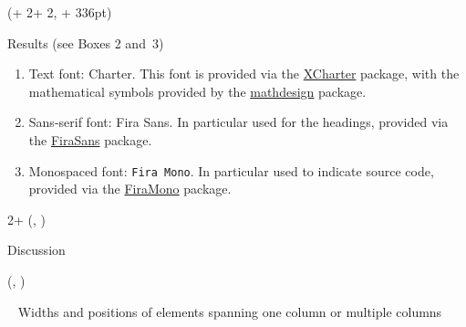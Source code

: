 \documentclass{beamer}
\newlength{\blockThree}
\newlength{\blockFour}
\begin{document}
\begin{frame}[t]
\begin{textblock*}{\colwidth}
\end{textblock*}




\begin{textblock*}{\colwidth}(\leftmargin + 2\colwidth + 2\colsep, \blockThree + 336pt)

\begin{parblock}{Results {\mdseries(see Boxes 2 and~3)}}
	\vspace{-1.333333\baselineskip}  %
	\begin{enumerate}
		\item \alert{Text font:} \textrm{Charter}. This font is provided via the \href{https://ctan.org/pkg/xcharter}{XCharter} package, with the mathematical symbols provided by the \href{https://ctan.org/pkg/mathdesign}{mathdesign} package. 
		\item \alert{Sans-serif font:} \textsf{Fira Sans}. In particular used for the headings, provided via the \href{https://ctan.org/pkg/fira}{FiraSans} package.
		\item \alert{Monospaced font:} \texttt{Fira Mono}. In particular used to indicate source code, provided via the \href{https://ctan.org/pkg/fira}{FiraMono} package.
	\end{enumerate}
\end{parblock}

\end{textblock*}




\begin{textblock*}{2\colwidth + \colsep}(\leftmargin, \blockFour)

\begin{parblock}{Discussion}
\end{parblock}

\end{textblock*}




\begin{textblock*}{\colwidth}(\leftmargin, \blockFour)

\begin{parblock}{~}  %
	\alert{Widths and positions of elements spanning one column or multiple columns}\vspace{0.333333\baselineskip}


\end{parblock}
\end{textblock*}
\end{frame}
\end{document}
